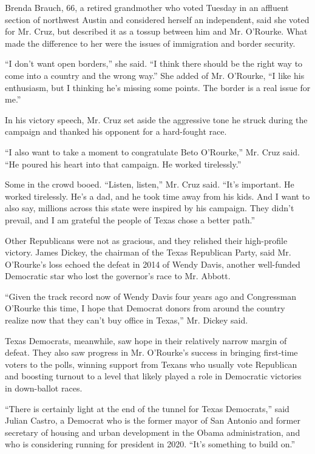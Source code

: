 Brenda Brauch, 66, a retired grandmother who voted Tuesday in an
affluent section of northwest Austin and considered herself an
independent, said she voted for Mr. Cruz, but described it as a tossup
between him and Mr. O'Rourke. What made the difference to her were the
issues of immigration and border security.

``I don't want open borders,'' she said. ``I think there should be the
right way to come into a country and the wrong way.'' She added of Mr.
O'Rourke, ``I like his enthusiasm, but I thinking he's missing some
points. The border is a real issue for me.''

In his victory speech, Mr. Cruz set aside the aggressive tone he struck
during the campaign and thanked his opponent for a hard-fought race.

``I also want to take a moment to congratulate Beto O'Rourke,'' Mr. Cruz
said. ``He poured his heart into that campaign. He worked tirelessly.''

Some in the crowd booed. ``Listen, listen,'' Mr. Cruz said. ``It's
important. He worked tirelessly. He's a dad, and he took time away from
his kids. And I want to also say, millions across this state were
inspired by his campaign. They didn't prevail, and I am grateful the
people of Texas chose a better path.''

Other Republicans were not as gracious, and they relished their
high-profile victory. James Dickey, the chairman of the Texas Republican
Party, said Mr. O'Rourke's loss echoed the defeat in 2014 of Wendy
Davis, another well-funded Democratic star who lost the governor's race
to Mr. Abbott.

``Given the track record now of Wendy Davis four years ago and
Congressman O'Rourke this time, I hope that Democrat donors from around
the country realize now that they can't buy office in Texas,'' Mr.
Dickey said.

Texas Democrats, meanwhile, saw hope in their relatively narrow margin
of defeat. They also saw progress in Mr. O'Rourke's success in bringing
first-time voters to the polls, winning support from Texans who usually
vote Republican and boosting turnout to a level that likely played a
role in Democratic victories in down-ballot races.

``There is certainly light at the end of the tunnel for Texas
Democrats,'' said Julian Castro, a Democrat who is the former mayor of
San Antonio and former secretary of housing and urban development in the
Obama administration, and who is considering running for president in
2020. ``It's something to build on.''

